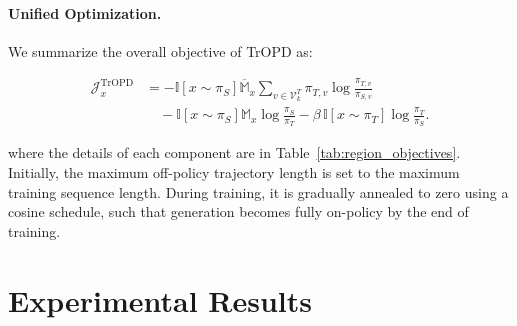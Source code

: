 \documentclass{article} %
\begin{document}
\paragraph{Unified Optimization.}
We summarize the overall objective of TrOPD as:

\begin{equation}
\begin{aligned}
\mathcal{J}_{x}^{\mathrm{TrOPD}}
&=
-{
  \mathbb{I}[x \sim \pi_S]\overline{\mathbb{M}}_{x}}
 {
  \sum_{v \in \mathcal{V}^{T}_{k}}
  \pi_{T,v}
  \log \frac{\pi_{T,v}}{\pi_{S,v}}
 } \\
&\quad
-
{
  \mathbb{I}[x \sim \pi_S]\mathbb{M}_{x}}
\log \frac{\pi_S}{\pi_T}
-
\beta \,
\mathbb{I}[x \sim \pi_T]
\log \frac{\pi_T}{\pi_S} .
\end{aligned}
\end{equation}


where the details of each component are in Table~\ref{tab:region_objectives}. Initially, the maximum off-policy trajectory length is set to the maximum training sequence length. During training, it is gradually annealed to zero using a cosine schedule, such that generation becomes fully on-policy by the end of training.

















\section{Experimental Results}
\end{document}
